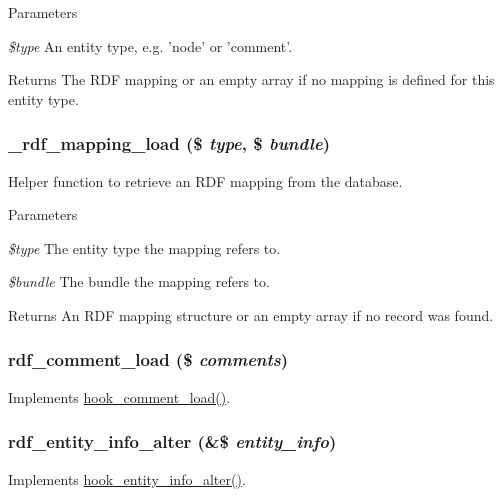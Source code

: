 \begin{DoxyParams}{Parameters}
\item[{\em \$type}]An entity type, e.g. 'node' or 'comment'.\end{DoxyParams}
\begin{DoxyReturn}{Returns}
The RDF mapping or an empty array if no mapping is defined for this entity type. 
\end{DoxyReturn}
\hypertarget{rdf_8module_a0fc272cd2d678697bfba1457fc5ffa0f}{
\subsubsection[{\_\-rdf\_\-mapping\_\-load}]{\setlength{\rightskip}{0pt plus 5cm}\_\-rdf\_\-mapping\_\-load (\$ {\em type}, \/  \$ {\em bundle})}}
\label{rdf_8module_a0fc272cd2d678697bfba1457fc5ffa0f}
Helper function to retrieve an RDF mapping from the database.


\begin{DoxyParams}{Parameters}
\item[{\em \$type}]The entity type the mapping refers to. \item[{\em \$bundle}]The bundle the mapping refers to.\end{DoxyParams}
\begin{DoxyReturn}{Returns}
An RDF mapping structure or an empty array if no record was found. 
\end{DoxyReturn}
\hypertarget{rdf_8module_ac54e6d05b05523c4f44e0e6f5901338b}{
\subsubsection[{rdf\_\-comment\_\-load}]{\setlength{\rightskip}{0pt plus 5cm}rdf\_\-comment\_\-load (\$ {\em comments})}}
\label{rdf_8module_ac54e6d05b05523c4f44e0e6f5901338b}
Implements \hyperlink{group__hooks_gafc29ce3a5bfc4778125ee3099850d96c}{hook\_\-comment\_\-load()}. \hypertarget{rdf_8module_aba691a244451c05199bf3aec8736fefe}{
\subsubsection[{rdf\_\-entity\_\-info\_\-alter}]{\setlength{\rightskip}{0pt plus 5cm}rdf\_\-entity\_\-info\_\-alter (\&\$ {\em entity\_\-info})}}
\label{rdf_8module_aba691a244451c05199bf3aec8736fefe}
Implements \hyperlink{group__hooks_ga0394a72e4872603e91ce22440195ab45}{hook\_\-entity\_\-info\_\-alter()}.

